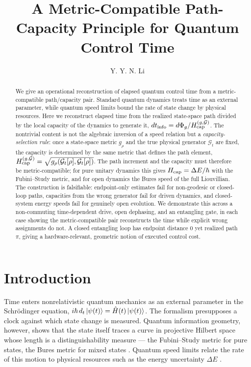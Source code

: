 \documentclass[12pt]{article}
\title{\textbf{A Metric-Compatible Path-Capacity Principle for Quantum Control Time}}
\author{Y. Y. N. Li}
\date{}
\begin{document}
\maketitle

\begin{abstract}
We give an operational reconstruction of elapsed quantum control time from a metric-compatible path/capacity pair. Standard quantum dynamics treats time as an external parameter, while quantum speed limits bound the rate of state change by physical resources. Here we reconstruct elapsed time from the realized state-space path divided by the local capacity of the dynamics to generate it, \(dt_{\rm info}=d\Phi_g/H_{\rm cap}^{(g,\mathcal G)}\). The nontrivial content is not the algebraic inversion of a speed relation but a \emph{capacity-selection rule}: once a state-space metric \(g_\rho\) and the true physical generator \(\mathcal G_t\) are fixed, the capacity is determined by the same metric that defines the path element, \(H_{\rm cap}^{(g,\mathcal G)}=\sqrt{g_\rho(\mathcal G_t[\rho],\mathcal G_t[\rho])}\). The path increment and the capacity must therefore be metric-compatible; for pure unitary dynamics this gives \(H_{\rm cap}=\Delta E/\hbar\) with the Fubini--Study metric, and for open dynamics the Bures speed of the full Liouvillian. The construction is falsifiable: endpoint-only estimates fail for non-geodesic or closed-loop paths, capacities from the wrong generator fail for driven dynamics, and closed-system energy speeds fail for genuinely open evolution. We demonstrate this across a non-commuting time-dependent drive, open dephasing, and an entangling gate, in each case showing the metric-compatible pair reconstructs the time while explicit wrong assignments do not. A closed entangling loop has endpoint distance \(0\) yet realized path \(\pi\), giving a hardware-relevant, geometric notion of executed control cost.
\end{abstract}

\section{Introduction}

Time enters nonrelativistic quantum mechanics as an external parameter in the Schr\"odinger equation, \(i\hbar\,d_t\ket{\psi(t)}=\hat H(t)\ket{\psi(t)}\). The formalism presupposes a clock against which state change is measured. Quantum information geometry, however, shows that the state itself traces a curve in projective Hilbert space whose length is a distinguishability measure --- the Fubini--Study metric for pure states, the Bures metric for mixed states \cite{Uhlmann1976,Bures1969,BraunsteinCaves1994}. Quantum speed limits relate the rate of this motion to physical resources such as the energy uncertainty \(\Delta E\) \cite{MandelstamTamm1945,AnandanAharonov1990,DeffnerCampbell2017}.
\end{document}

